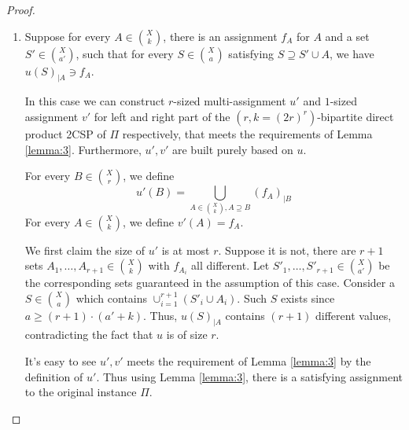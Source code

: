 \begin{proof}
\begin{enumerate}
    Given $a \ge k$ and $b \ge r\cdot b'+a$, we can apply Lemma \ref{lemma:2} to know that there is an assignment $f_A$ on $A$, such that for every $T' \in \binom{X}{b'}$, there is $T \in \binom{X}{b}$ satisfying $T \supseteq T'\cup A$ and $v(T)_{|A}\ni f_A$.

    We therefore build multi-assignments $u',v'$ for the smaller $(a',b')$-bipartite 2CSP instance as follows.

    For every $S' \in \binom{X}{a'}$, we pick the set $S$ guaranteed by the assumption of this case, and define $u'(S')=u(S)_{|S'}$. Note that $u'$ still has size at most $r$.

    For every $T' \in \binom{X}{b'}$, we pick the set $T$ guaranteed by Lemma \ref{lemma:2}, and define $v'(T')=\{\sigma \in v(T)| \sigma_{|A} \neq f_A\}_{|T'}$. By the assumption, there exists $S \in \binom{X}{a}$ satisfying $S \supseteq A$ and $u(S)_{|A}\not\ni f_A$. Thus to be consistent with $u(S)_{|A}$, we can conclude for every $T \in \binom{X}{b}$ containing $A$, $v(T)_{|A}$ should also contain some value other than $f_A$. Therefore, our constructed $v'$ is non-empty and has size at most $q-1$.

    It's also easy to see $u',v'$ still satisfy list consistency, since in $v'$ we only discard the assignments whose restriction on $A$ equals to $f_A$, which are not consistent with any $u'$.
    
    \item Suppose for every $A \in \binom{X}{k}$, there is an assignment $f_A$ for $A$ and a set $S' \in \binom{X}{a'}$, such that for every $S \in \binom{X}{a}$ satisfying $S \supseteq S' \cup A$, we have $u(S)_{|A}\ni f_A$.

    In this case we can construct $r$-sized multi-assignment $u'$ and $1$-sized assignment $v'$ for left and right part of the $(r,k=(2r)^r)$-bipartite direct product 2CSP of $\Pi$ respectively, that meets the requirements of Lemma \ref{lemma:3}. Furthermore, $u',v'$ are built purely based on $u$.

    For every $B \in \binom{X}{r}$, we define
    \[
    u'(B)=\bigcup_{A \in \binom{X}{k},A \supseteq B} (f_A)_{|B}
    \]
    For every $A \in \binom{X}{k}$, we define $v'(A)=f_A$.
    
    We first claim the size of $u'$ is at most $r$. Suppose it is not, there are $r+1$ sets $A_1,\ldots,A_{r+1} \in \binom{X}{k}$ with $f_{A_i}$ all different. Let $S'_1,\ldots,S'_{r+1}\in\binom{X}{a'}$ be the corresponding sets guaranteed in the assumption of this case. Consider a $S \in \binom{X}{a}$ which contains $\cup_{i=1}^{r+1}(S'_i \cup A_i)$. Such $S$ exists since $a \ge (r+1)\cdot (a'+k)$. Thus, $u(S)_{|A}$ contains $(r+1)$ different values, contradicting the fact that $u$ is of size $r$.

    It's easy to see $u',v'$ meets the requirement of Lemma \ref{lemma:3} by the definition of $u'$. Thus using Lemma \ref{lemma:3}, there is a satisfying assignment to the original instance $\Pi$. \qedhere
\end{enumerate}
\end{proof}

